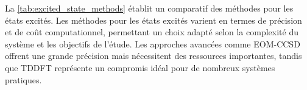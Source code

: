 {}La \autoref{tab:excited_state_methods} établit un comparatif des méthodes pour les états excités.\markdownRendererInterblockSeparator
{}\markdownRendererInterblockSeparator
{}Les méthodes pour les états excités varient en termes de précision et de coût computationnel, permettant un choix adapté selon la complexité du système et les objectifs de l'étude. Les approches avancées comme EOM-CCSD offrent une grande précision mais nécessitent des ressources importantes, tandis que TDDFT représente un compromis idéal pour de nombreux systèmes pratiques.
\markdownRendererSectionEnd 
\markdownRendererSectionEnd 
\markdownRendererSectionEnd 
\markdownRendererSectionEnd \markdownRendererDocumentEnd